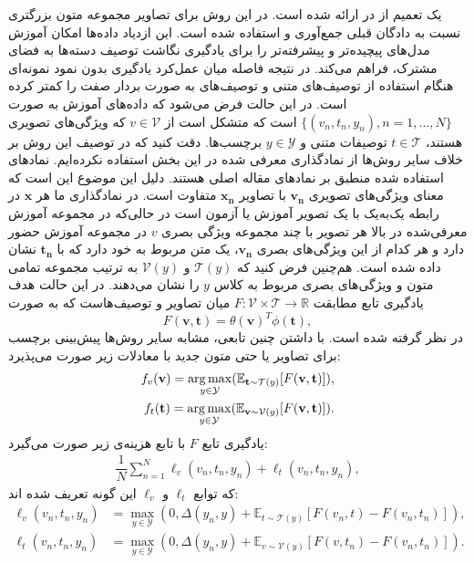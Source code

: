  یک تعمیم  از  در \cite{Reed2016} ارائه شده است. در این روش برای تصاویر مجموعه متون بزرگتری نسبت به دادگان قبلی 
 \cite{mohamed13}
  جمع‌آوری و استفاده شده است.
  این ازدیاد داده‌ها امکان آموزش مدل‌های پیچیده‌تر و پیشرفته‌تر را برای یادگیری نگاشت توصیف دسته‌ها به فضای مشترک، فراهم می‌کند. در نتیجه فاصله میان عمل‌کرد یادگیری بدون نمود نمونه‌ای هنگام استفاده از
  توصیف‌های متنی و توصیف‌های به صورت بردار صفت را کمتر کرده است.
  در این حالت فرض می‌شود که داده‌های آموزش به صورت
   $\{(v_{n},t_{n},y_{n}), n = 1, ..., N\}$
   است که متشکل است از
    $v \in \mathcal{V}$
    که ویژگی‌های تصویری هستند،
     $t \in \mathcal{T}$ توصیفات متنی و $y \in \mathcal{Y}$ برچسب‌ها.
      دقت کنید که در توصیف این روش بر خلاف سایر روش‌ها از نمادگذاری معرفی شده در این بخش استفاده نکرده‌ایم.
      نمادهای استفاده شده منطبق بر نمادهای مقاله اصلی هستند. دلیل این موضوع این است که معنای ویژگی‌های تصویری $\mathbf{v_n} $ با تصاویر  $\mathbf{x_n} $ متفاوت است. در نمادگذاری ما هر $\mathbf{x} $ در رابطه یک‌به‌یک با یک تصویر آموزش یا آزمون است در حالی‌که در مجموعه آموزش معرفی‌شده در بالا هر تصویر با چند مجموعه ویژگی بصری $v$ در مجموعه آموزش حضور دارد و هر کدام از این ويژگی‌های بصری $\mathbf{v_n} $، یک متن مربوط به خود دارد که با $\mathbf{t_n} $ نشان داده ‌شده است. هم‌چنین فرض کنید که  $\mathcal{T}(y)$ و $\mathcal{V}(y)$ به ترتیب مجموعه تمامی متون و ویژگی‌های بصری مربوط به کلاس $y$ را نشان می‌دهند.
  در این حالت هدف یادگیری تابع مطابقت $F : \mathcal{V} \times \mathcal{T} \rightarrow \mathbb{R}$ میان تصاویر و توصیف‌هاست که به صورت
  \begin{equation}
  \label{eq:akata16comp}
F(\mathbf{v, t} ) = \theta(\mathbf{v} )^T\phi(\mathbf{t} ),
  \end{equation}
در نظر گرفته شده است. با داشتن چنین تابعی، مشابه سایر روش‌ها پیش‌بینی برچسب برای تصاویر یا حتی متون جدید با معادلات زیر صورت می‌پذیرد:
\begin{align}
\label{eq:akata16class}
f_v(\mathbf{v} ) = \underset{y \in \mathcal{Y}}{\operatorname*{arg\,max}} ( \mathbb{ E}_{\mathbf{t}  \sim \mathcal{T}(y)}[F(\mathbf{v, t} )]),\\
f_t(\mathbf{t} ) = \underset{y \in \mathcal{Y}}{\operatorname*{arg\,max}} (\mathbb{ E}_{\mathbf{v}  \sim \mathcal{V}(y)}[F(\mathbf{v, t} )]).
\end{align}
یادگیری تابع $F$ با تابع هزینه‌ی زیر صورت می‌گیرد:
\begin{align}
\label{eq:objective_actual}
\dfrac{1}{N}\sum_{n=1}^{N} \ell_v(v_n, t_n, y_n) + \ell_t(v_n, t_n, y_n),
\end{align}
که توابع $ \ell_t$ و $\ell_v$ این گونه تعریف شده اند:
\begin{align*}
\ell_v(v_n, t_n, y_n) &=  \underset{y \in \mathcal{Y}}{\max}(0,\Delta(y_n, y) + \mathbb{E}_{t \sim \mathcal{T}(y)} [ F(v_n,t) - F(v_n,t_n) ]), \\
\ell_t(v_n, t_n, y_n) &= \underset{y \in \mathcal{Y}}{\max}(0,\Delta(y_n, y) + \mathbb{E}_{v \sim \mathcal{V}(y)} [ F(v,t_n) - F(v_n,t_n)]).
\end{align*}
